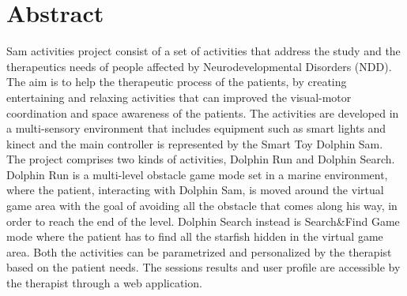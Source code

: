 \chapter{Abstract}
Sam activities project consist of a set of activities that address the study and the therapeutics needs of people affected by Neurodevelopmental Disorders (NDD).
The aim is to help the therapeutic process of the patients, by creating entertaining and relaxing activities that can improved the visual-motor coordination and space awareness of the patients. 
The activities are developed in a multi-sensory environment that includes equipment such as smart lights and kinect and the main controller is represented by the Smart Toy Dolphin Sam. \newline
The project comprises two kinds of activities, Dolphin Run and Dolphin Search. Dolphin Run is a multi-level obstacle game mode set in a marine environment, where the patient, interacting with Dolphin Sam, is moved around the virtual game area with the goal of avoiding all the obstacle that comes along his way, in order to reach the end of the level. Dolphin Search instead is Search\&Find Game mode where the patient has to find all the starfish hidden in the virtual game area.
Both the activities can be parametrized and personalized by the therapist based on the patient needs. The sessions results and user profile are accessible by the therapist through a web application.
